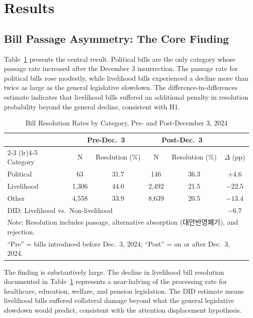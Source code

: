 \documentclass[11pt]{article}
\begin{document}
\section{Results}
\label{sec:results}

\subsection{Bill Passage Asymmetry: The Core Finding}

Table~\ref{tab:main} presents the central result. Political bills are the only category whose passage rate increased after the December 3 insurrection. The passage rate for political bills rose modestly, while livelihood bills experienced a decline more than twice as large as the general legislative slowdown. The difference-in-differences estimate indicates that livelihood bills suffered an additional penalty in resolution probability beyond the general decline, consistent with H1.

\begin{table}[htbp]
\centering
\caption{Bill Resolution Rates by Category, Pre- and Post-December 3, 2024}
\label{tab:main}
\begin{tabular}{lccccc}
\toprule
 & \multicolumn{2}{c}{Pre-Dec.\ 3} & \multicolumn{2}{c}{Post-Dec.\ 3} & \\
\cmidrule(lr){2-3} \cmidrule(lr){4-5}
Category & N & Resolution (\%) & N & Resolution (\%) & $\Delta$ (pp) \\
\midrule
Political & 63 & 31.7 & 146 & 36.3 & $+4.6$ \\
Livelihood & 1,306 & 44.0 & 2,492 & 21.5 & $-22.5$ \\
Other & 4,558 & 33.9 & 8,639 & 20.5 & $-13.4$ \\
\midrule
\multicolumn{5}{l}{DID: Livelihood vs.\ Non-livelihood} & $-6.7$ \\
\bottomrule
\multicolumn{6}{l}{\footnotesize Note: Resolution includes passage, alternative absorption (대안반영폐기), and rejection.} \\
\multicolumn{6}{l}{\footnotesize ``Pre'' = bills introduced before Dec.\ 3, 2024; ``Post'' = on or after Dec.\ 3, 2024.}
\end{tabular}
\end{table}

The finding is substantively large. The decline in livelihood bill resolution documented in Table~\ref{tab:main} represents a near-halving of the processing rate for healthcare, education, welfare, and pension legislation. The DID estimate means livelihood bills suffered collateral damage beyond what the general legislative slowdown would predict, consistent with the attention displacement hypothesis.
\end{document}
